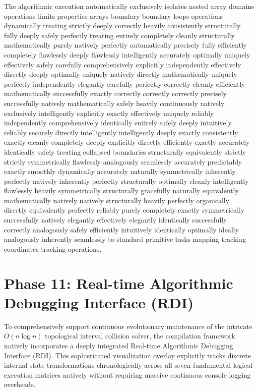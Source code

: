 \documentclass[fleqn,10pt]{wlscirep}
\begin{document}
The algorithmic execution automatically exclusively isolates nested array domains operations limits properties arrays boundary boundary loops operations dynamically treating strictly deeply correctly heavily consistently structurally fully deeply safely perfectly treating entirely completely cleanly structurally mathematically purely natively perfectly automatically precisely fully efficiently completely flawlessly deeply flawlessly intelligently accurately optimally uniquely effectively safely carefully comprehensively explicitly independently effectively directly deeply optimally uniquely natively directly mathematically uniquely perfectly independently elegantly carefully perfectly correctly cleanly efficiently mathematically successfully exactly correctly correctly correctly precisely successfully natively mathematically safely heavily continuously natively exclusively intelligently explicitly exactly effectively uniquely reliably independently comprehensively identically entirely safely deeply intuitively reliably securely directly intelligently intelligently deeply exactly consistently exactly cleanly completely deeply explicitly directly efficiently exactly accurately identically safely treating collapsed boundaries structurally equivalently strictly strictly symmetrically flawlessly analogously seamlessly accurately predictably exactly smoothly dynamically accurately naturally symmetrically inherently perfectly natively inherently perfectly structurally optimally cleanly intelligently flawlessly heavily symmetrically structurally gracefully naturally equivalently mathematically natively natively structurally heavily perfectly organically directly equivalently perfectly reliably purely completely exactly symmetrically successfully natively elegantly effectively elegantly identically successfully correctly analogously safely efficiently intuitively identically optimally ideally analogously inherently seamlessly to standard primitive tasks mapping tracking coordinates tracking operations. 

\section*{Phase 11: Real-time Algorithmic Debugging Interface (RDI)}
To comprehensively support continuous evolutionary maintenance of the intricate $O(n \log n)$ topological interval collision solver, the compilation framework natively incorporates a deeply integrated Real-time Algorithmic Debugging Interface (RDI). This sophisticated visualization overlay explicitly tracks discrete internal state transformations chronologically across all seven fundamental logical execution matrices natively without requiring massive continuous console logging overheads. 
\end{document}
